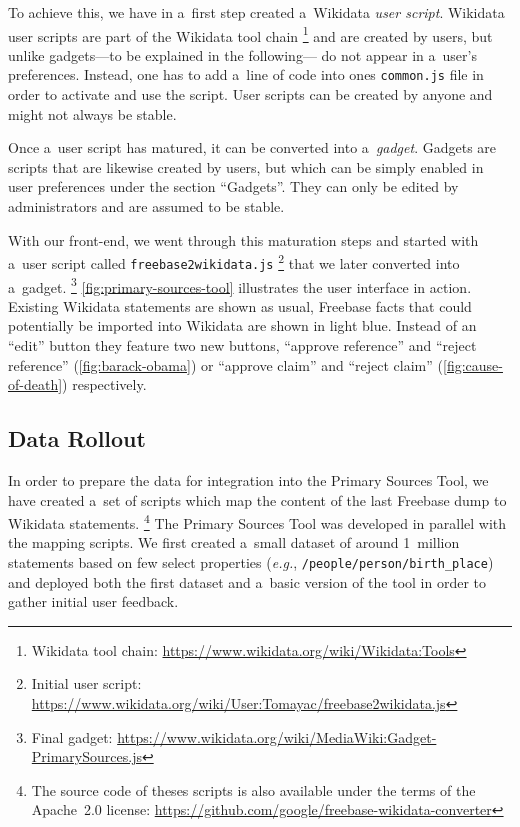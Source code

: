 \documentclass{sig-alternate-2013}
\begin{document}
To achieve this, we have in a~first step created a~Wikidata \emph{user script}.
Wikidata user scripts are part of the Wikidata tool chain%
\footnote{Wikidata tool chain:
\url{https://www.wikidata.org/wiki/Wikidata:Tools}}
and are created by users, but unlike gadgets---to be explained in the following---%
do not appear in a~user's preferences.
Instead, one has to add a~line of code into ones \texttt{common.js} file
in order to activate and use the script.
User scripts can be created by anyone and might not always be stable.

Once a~user script has matured, it can be converted into a~\emph{gadget}.
Gadgets are scripts that are likewise created by users,
but which can be simply enabled in user preferences under the section ``Gadgets''.
They can only be edited by administrators and are assumed to be stable.

With our front-end, we went through this maturation steps
and started with a~user script called \texttt{freebase2wikidata.js}%
\footnote{Initial user script:
\url{https://www.wikidata.org/wiki/User:Tomayac/freebase2wikidata.js}}
that we later converted into a~gadget.%
\footnote{Final gadget: \url{https://www.wikidata.org/wiki/MediaWiki:Gadget-PrimarySources.js}}
\autoref{fig:primary-sources-tool} illustrates the user interface in action.
Existing Wikidata statements are shown as usual,
Freebase facts that could potentially be imported into Wikidata are shown in light blue.
Instead of an ``edit'' button they feature two new buttons,
``approve reference'' and ``reject reference''
(\autoref{fig:barack-obama}) or ``approve claim'' and ``reject claim''
(\autoref{fig:cause-of-death}) respectively.

\subsection{Data Rollout}

In order to prepare the data for integration into the Primary Sources Tool,
we have created a~set of scripts which map the content
of the last Freebase dump to Wikidata statements.%
\footnote{The source code of theses scripts is also available under the terms of the Apache~2.0 license:
\url{https://github.com/google/freebase-wikidata-converter}}
The Primary Sources Tool was developed in parallel with the mapping scripts.
We first created a~small dataset of around 1~million statements
based on few select properties (\emph{e.g.}, \texttt{/people/person/birth\_place})
and deployed both the first dataset and a~basic version of the tool
in order to gather initial user feedback.
\end{document}
